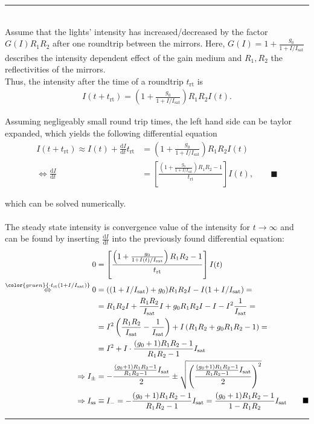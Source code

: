 \documentclass{article}
\newcommand{\diff}{\mathrm{d}}
\newcommand{\lr}[1]{\left(#1\right)}
\newcommand{\lreck}[1]{\left[#1\right]}
\newcommand{\comment}[1]{{\color{gruen} {#1}}}
\begin{document}
{\color{violet}
\hrule
	\\
	Assume that the lights' intensity has increased/decreased by the factor $G(I) R_1 R_2$ after one roundtrip between the mirrors. Here, $G(I) = 1 + \frac{g_0}{1 + I/I_\text{sat}}$ describes the intensity dependent effect of the gain medium and $R_1, R_2$ the reflectivities of the mirrors.\\
	Thus, the intensity after the time of a roundtrip $t_\text{rt}$ is
		\begin{align*}
			I(t + t_\text{rt}) = \lr{ 1 + \frac{g_0}{1 + I/I_\text{sat}} } R_1 R_2 I(t).
		\end{align*}
	
	Assuming negligeably small round trip times, the left hand side can be taylor expanded, which yields the following differential equation
		\begin{align*}
			I(t + t_\text{rt}) \approx I(t) + \frac{\diff I}{\diff t} t_\text{rt} &= \lr{ 1 + \frac{g_0}{1 + I/I_\text{sat}} } R_1 R_2 I(t) \\
			\Leftrightarrow \frac{\diff I}{\diff t} &= \lreck{ \frac{ \lr{ 1 + \frac{g_0}{1 + I/I_\text{sat}} } R_1 R_2 - 1 }{ t_\text{rt} } } I(t), \qquad \blacksquare
		\end{align*}
	
	which can be solved numerically.\\
	\\
	The steady state intensity is convergence value of the intensity for $t\to\infty$ and can be found by inserting $\frac{\diff I}{\diff t}$ into the previously found differential equation:
		\begin{align*}
			0 &= \lreck{ \frac{ \lr{ 1 + \frac{g_0}{1 + I(t)/I_\text{sat}} } R_1 R_2 - 1 }{ t_\text{rt} } } I(t) \\
			\stackrel{\comment{\cdot t_\text{rt} (1 + I/I_\text{sat})}}{\Leftrightarrow} 0 &= ((1 + I/I_\text{sat}) + g_0) R_1 R_2 I - I (1 + I/I_\text{sat}) = \\
			&= R_1 R_2 I + \frac{R_1 R_2}{I_\text{sat}} I + g_0 R_1 R_2 I - I - I^2 \frac{1}{I_\text{sat}} = \\
			&= I^2 \lr{ \frac{R_1R_2}{I_\text{sat}} - \frac{1}{I_\text{sat}} } + I \lr{ R_1 R_2 + g_0 R_1 R_2 - 1 } = \\
			&= I^2 + I \cdot \frac{(g_0 + 1)R_1 R_2 - 1}{R_1 R_2 - 1} I_\text{sat} \\
			\Rightarrow I_\pm &= - \frac{ \frac{(g_0 + 1)R_1 R_2 - 1}{R_1 R_2 - 1} I_\text{sat} }{2} \pm \sqrt{ \lr{ \frac{ \frac{(g_0 + 1)R_1 R_2 - 1}{R_1 R_2 - 1} I_\text{sat} }{2} }^2 } \\
			\Rightarrow I_\text{ss} &\equiv I_- = - \frac{(g_0 + 1)R_1 R_2 - 1}{R_1 R_2 - 1} I_\text{sat} = \frac{(g_0 + 1)R_1 R_2 - 1}{1 - R_1 R_2} I_\text{sat} \qquad \blacksquare
		\end{align*}
\hrule
}
\end{document}
